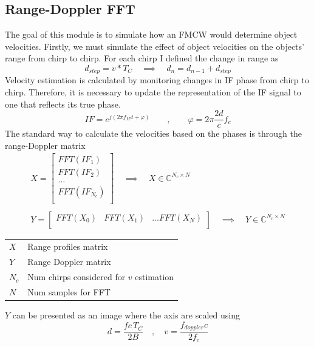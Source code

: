 \documentclass{article}
\begin{document}
\subsection{Range-Doppler FFT}
The goal of this module is to simulate how an FMCW would determine object
velocities. Firstly, we must simulate the effect of object velocities on the
objects' range from chirp to chirp. For each chirp I defined the change in
range as
\begin{equation*}
    d_{step} = v * T_C \quad \implies \quad
    d_n = d_{n-1} + d_{step}
\end{equation*}
Velocity estimation is calculated by monitoring changes in IF phase from chirp
to chirp. Therefore, it is necessary to update the representation of the IF
signal to one that reflects its true phase.
\begin{equation*}
    IF = e^{j(2\pi f_{IF} t + \varphi)} \qquad , \qquad
    \varphi = 2\pi \frac{2d}{c} f_c
\end{equation*}
The standard way to calculate the velocities based on the phases is through the
range-Doppler matrix
\begin{gather*}
    X = \begin{bmatrix}
        FFT\left(IF_1\right) \\
        FFT\left(IF_2\right) \\
        \dots \\
        FFT\left(IF_{N_c}\right) \\
    \end{bmatrix} \quad \implies \quad
    X \in \mathbb{C}^{N_c \times N} \\\\
    Y = \begin{bmatrix}
        FFT\left(X_0\right) &
        FFT\left(X_1\right) & \dots
        FFT\left(X_N\right) \\
    \end{bmatrix} \quad \implies \quad
    Y \in \mathbb{C}^{N_c \times N}
\end{gather*}
\begin{table}[H]
    \centering
    \begin{tabular}{ll}
        \toprule
        \midrule
        $X$ & Range profiles matrix \\
        $Y$ & Range Doppler matrix \\
        $N_c$ & Num chirps considered for $v$ estimation \\
        $N$ & Num samples for FFT \\
        \bottomrule
    \end{tabular}
\end{table}
\noindent $Y$ can be presented as an image where the axis are scaled using
\begin{equation*}
    d = \frac{fc\,T_C}{2B} \quad , \quad
    v = \frac{f_{doppler} c}{2f_c}
\end{equation*}
\end{document}
